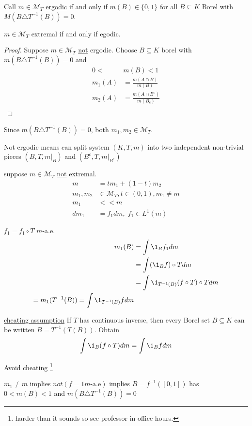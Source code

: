 \begin{definition}
	Call $m \in \mathcal{M}_T$ \underline{ergodic} if and only if $m(B) \in \{0,1\}$ for all 
	$B \subseteq K$ Borel with $M(B \triangle T^{-1}(B)) = 0$.
\end{definition}

\begin{theorem}
	$m \in \mathcal{M}_T$ extremal if and only if egodic.
\end{theorem}


\begin{proof}
	Suppose $m \in \mathcal{M}_T$ \underline{not} ergodic.
	Choose $B \subseteq K$ borel with $m(B \triangle T^{-1}(B)) = 0$ and 
	\begin{align*}
		0 < &m(B) < 1 \\
		m_1 (A) &= \frac{m(A \cap B)}{ m(B)} \\
		m_2 (A) &= \frac{m(A \cap B^{c})}{ m(B_{c})} \\
	\end{align*}
\end{proof}

\begin{exercise}
	Since $m (B \triangle T^{-1}(B)) = 0$, both $m_1, m_2 \in \mathcal{M}_T$.
\end{exercise}

\begin{remark}
	Not ergodic means can split system $(K, T, m)$ into two independent non-trivial pieces  $(B,T, m|_{B})$ and $(B^c, T, m|_{B^c})$
\end{remark}


suppose $m \in \mathcal{M}_T$ \underline{not} extremal.
\begin{align*}
	m &= t m_1 + (1-t) m_2 \\
	m_1, m_2 &\in \mathcal{M}_T, t \in (0,1), m_1 \neq m \\
	m_1 &<< m \\
	dm_1 &= f_1 dm, \; f_1 \in L^1 (m)
\end{align*}  

\begin{claim}
	$f_1 = f_1 \circ T$ $m$-a.e.
	\begin{align*}
		m_1 (B) &= \int \1_{B} f_1 dm \\
				&= \int (\1_{B} f) \circ T dm \\
				&= \int \1_{T^{-1}(B)} (f \circ T) \circ T dm \\
				= m_1 (T^{-1}(B)) = \int \1_{T^{-1}(B)} f dm
	\end{align*} 
\end{claim}

\underline{cheating assumption} If $T$ has continuous inverse, then every Borel set $B \subseteq K$ can be written
$B = T^{-1}(T(B))$.
Obtain
\[
	\int \1_{B} (f \circ T ) dm = \int \1_{B} f dm
\] 

\begin{exercise}
	Avoid cheating
	\footnote{harder than it sounds so see professor in office hours.}
\end{exercise}

$m_1 \neq m$ implies $not (f = 1 m\text{-a.e})$ implies $B = f^{-1}([0,1])$ has
$0 < m(B) < 1$ and $m (B \triangle T^{-1}(B)) = 0$
